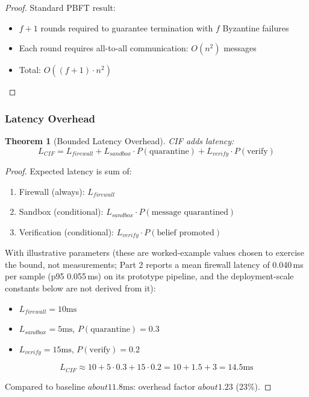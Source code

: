 \documentclass[
]{article}
\newtheorem{theorem}{Theorem}[section]
\begin{document}
\begin{proof}
Standard PBFT result:
\begin{itemize}
\item $f+1$ rounds required to guarantee termination with $f$ Byzantine failures
\item Each round requires all-to-all communication: $O(n^2)$ messages
\item Total: $O((f+1) \cdot n^2)$
\end{itemize}
\end{proof}

\subsubsection{Latency Overhead}\label{sec:latency-overhead}

\begin{theorem}[Bounded Latency Overhead]
\label{thm:latency-overhead}
CIF adds latency:
\begin{equation}
\label{eq:latency-formula}
L_{CIF} = L_{firewall} + L_{sandbox} \cdot P(\text{quarantine}) + L_{verify} \cdot P(\text{verify})
\end{equation}
\end{theorem}

\begin{proof}
Expected latency is sum of:
\begin{enumerate}
\item Firewall (always): $L_{firewall}$
\item Sandbox (conditional): $L_{sandbox} \cdot P(\text{message quarantined})$
\item Verification (conditional): $L_{verify} \cdot P(\text{belief promoted})$
\end{enumerate}

With illustrative parameters (these are worked-example values chosen to exercise the bound, not measurements; Part 2 reports a mean firewall latency of 0.040\,ms per sample (p95 0.055\,ms) on its prototype pipeline, and the deployment-scale constants below are not derived from it):
\begin{itemize}
\item $L_{firewall} = 10\text{ms}$
\item $L_{sandbox} = 5\text{ms}$, $P(\text{quarantine}) = 0.3$
\item $L_{verify} = 15\text{ms}$, $P(\text{verify}) = 0.2$
\end{itemize}

\begin{equation}
\label{eq:latency-empirical}
L_{CIF} \approx 10 + 5 \cdot 0.3 + 15 \cdot 0.2 = 10 + 1.5 + 3 = 14.5\text{ms}
\end{equation}

Compared to baseline $about 11.8\text{ms}$: overhead factor $about 1.23$ (23\%).
\end{proof}
\end{document}
